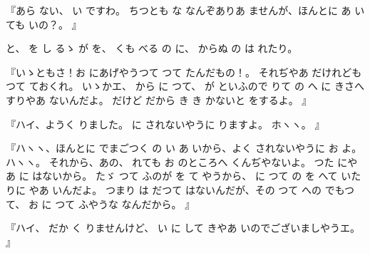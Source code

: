 『あら
ない、
い
ですわ。
ちつとも
な
なんぞありあ
ませんが、ほんとに
あ
いても
いの？。
』

と、
を
し
るゝ
が
を、
くも
べる
の
に、
からぬ
の
は
れたり。

『いゝともさ！お
にあげやうつて
つて
たんだもの！。
それぢやあ
だけれども
つて
ておくれ。
いゝかエ、
から
に
つて、
が
といふので
りて
の
へ
に
きさへすりやあ
ないんだよ。
だけど
だから
き
き
かないと
をするよ。
』

『ハイ、ようく
りました。
に
されないやうに
りますよ。
ホヽヽ。
』

『ハヽヽ、ほんとに
でまごつく
の
い
あ
いから、よく
されないやうに
お
よ。
ハヽヽ。
それから、あの、
れても
お
のところへ
くんぢやないよ。
つた
にやあ
に
はないから。
たゞ
つて
ふのが
を
て
やうから、
に
つて
の
を
へて
いた
りに
やあ
いんだよ。
つまり
は
だつて
はないんだが、その
つて
への
でもつて、
お
に
つて
ふやうな
なんだから。
』

『ハイ、
だか
く
りませんけど、
い
に
して
きやあ
いのでございましやうエ。
』

